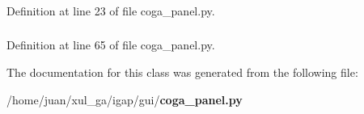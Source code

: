 \subsubsection{}\label{classgui_1_1coga__panel_1_1CollaboratePanel_8d3145140ee6bdf027b6bfb162b2960b}




Definition at line 23 of file coga\_\-panel.py.
\subsubsection{}\label{classgui_1_1coga__panel_1_1CollaboratePanel_f03ee0bf3bfe7c0364e82e24fcbd22af}




Definition at line 65 of file coga\_\-panel.py.

The documentation for this class was generated from the following file:\begin{CompactItemize}
\item 
/home/juan/xul\_\-ga/igap/gui/{\bf coga\_\-panel.py}\end{CompactItemize}
